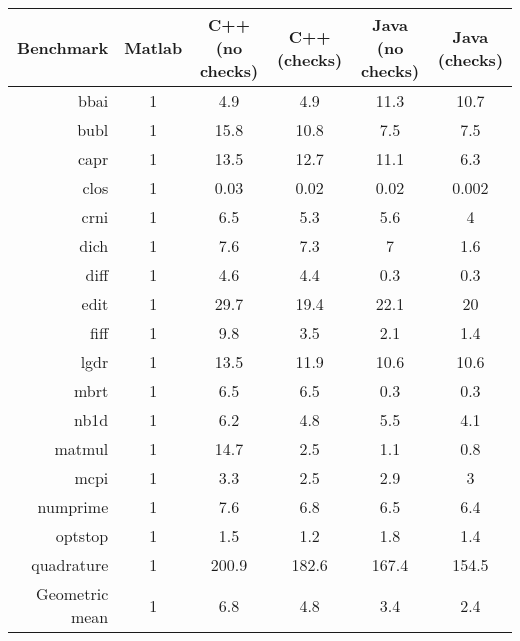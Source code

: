 \begin{tabular}{|r|c|c c|c c|} \hline Benchmark      & Matlab & C++ (no checks)
& C++ (checks) & Java (no checks) & Java (checks) \\ \hline bbai           & 1
& 4.9             & 4.9          & 11.3             & 10.7          \\ bubl
& 1      & 15.8            & 10.8         & 7.5              & 7.5           \\
capr           & 1      & 13.5            & 12.7         & 11.1             &
6.3           \\ clos           & 1      & 0.03            & 0.02         & 0.02
& 0.002         \\ crni           & 1      & 6.5             & 5.3          &
5.6              & 4             \\ dich           & 1      & 7.6             &
7.3          & 7                & 1.6           \\ diff           & 1      & 4.6
& 4.4          & 0.3              & 0.3           \\ edit           & 1      &
29.7            & 19.4         & 22.1             & 20            \\ fiff
& 1      & 9.8             & 3.5          & 2.1              & 1.4           \\
lgdr           & 1      & 13.5            & 11.9         & 10.6             &
10.6          \\ mbrt           & 1      & 6.5             & 6.5          & 0.3
& 0.3           \\ nb1d           & 1      & 6.2             & 4.8          &
5.5              & 4.1           \\ matmul         & 1      & 14.7            &
2.5          & 1.1              & 0.8           \\ mcpi           & 1      & 3.3
& 2.5          & 2.9              & 3             \\ numprime       & 1      &
7.6             & 6.8          & 6.5              & 6.4           \\ optstop
& 1      & 1.5             & 1.2          & 1.8              & 1.4           \\
quadrature     & 1      & 200.9           & 182.6        & 167.4            &
154.5         \\ \hline Geometric mean & 1      & 6.8             & 4.8
& 3.4              & 2.4           \\ \hline
\end{tabular}
